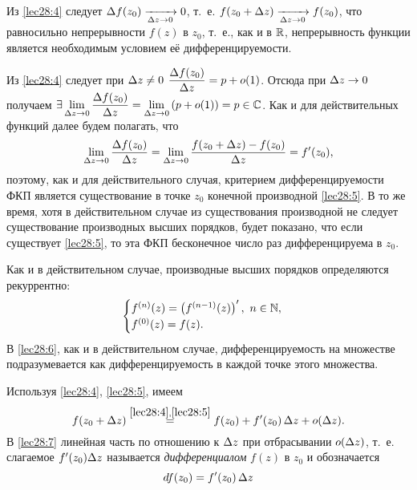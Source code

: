 \documentclass[../../main.tex]{subfiles}
\begin{document}
Из \eqref{lec28:4} следует
$\Delta f(z_0) \xrightarrow[\Delta z \to 0]{} 0$,
т.~е. $f(z_0 + \Delta z) \xrightarrow[\Delta z \to 0]{} f(z_0)$,
что равносильно непрерывности $f(z)$ в $z_0$,
т.~е., как и в $\mathbb{R}$, непрерывность функции является необходимым условием её
дифференцируемости.

Из \eqref{lec28:4} следует при $\Delta z \ne 0$ \quad
$\dfrac{\Delta f(z_0)}{\Delta z} = p + o(1)$.
Отсюда при $\Delta z \to 0$ получаем
$\exists \lim\limits_{\Delta z \to 0} \dfrac{\Delta f(z_0)}{\Delta z} =
\lim\limits_{\Delta z \to 0} \left(p + o(1)\right) = p \in \mathbb{C}$.
Как и для действительных функций далее будем полагать, что
\begin{equation}
\label{lec28:5}
\lim\limits_{\Delta z \to 0} \frac{\Delta f(z_0)}{\Delta z} =
\lim\limits_{\Delta z \to 0} \frac{f(z_0 + \Delta z) - f(z_0)}{\Delta z} = f'(z_0),
\end{equation}
поэтому, как и для действительного случая, критерием дифференцируемости ФКП
является существование в точке $z_0$ конечной производной \eqref{lec28:5}.
В то же время, хотя в действительном случае из существования производной
не следует существование производных высших порядков,
будет показано, что если существует \eqref{lec28:5}, то эта ФКП
бесконечное число раз дифференцируема в $z_0$.

Как и в действительном случае, производные высших порядков определяются 
рекуррентно:
\begin{equation}
\label{lec28:6}
\begin{cases}
	f^{(n)} (z) = \left(f^{(n - 1)} (z)\right)',\ n \in \mathbb{N}, \\
	f^{(0)} (z) = f(z).
\end{cases}
\end{equation}
В \eqref{lec28:6}, как и в действительном случае, дифференцируемость
на множестве подразумевается как дифференцируемость в каждой точке
этого множества.

Используя \eqref{lec28:4}, \eqref{lec28:5}, имеем
\begin{equation}
\label{lec28:7}
f(z_0 + \Delta z) \stackrel{\eqref{lec28:4}, \eqref{lec28:5}}{=}
f(z_0) + f'(z_0)\, \Delta z + o(\Delta z).
\end{equation}
В \eqref{lec28:7} линейная часть по отношению к $\Delta z$ при отбрасывании
$o(\Delta z)$, т.~е. слагаемое $f'(z_0) \Delta z$ называется \emph{дифференциалом}
$f(z)$ в $z_0$ и обозначается 
\begin{equation}
\label{lec28:8}
d f(z_0) = f'(z_0)\, \Delta z
\end{equation}
\end{document}
